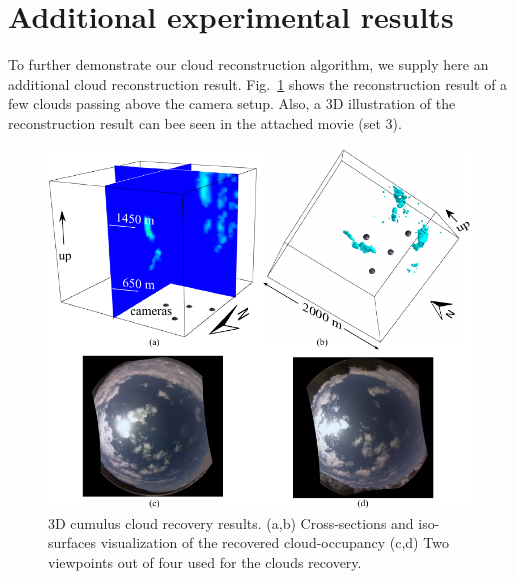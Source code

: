 \documentclass[runningheads]{llncs}
\begin{document}
\section{Additional experimental results}
\label{sec:addexp}

To further demonstrate our cloud reconstruction algorithm, we supply
here an additional cloud reconstruction result. Fig.~\ref{fig:scene}
shows the reconstruction result of a few clouds passing above the
camera setup.  Also, a 3D illustration of the reconstruction result
can bee seen in the attached movie (set 3).

\begin{figure}
  \begin{center}
    \includegraphics{figures/clouds_reconstructions_supp}
    \caption{3D cumulus cloud recovery results. (a,b) Cross-sections
      and iso-surfaces visualization of the recovered cloud-occupancy
      (c,d) Two viewpoints out of four used for the clouds recovery.}
    \label{fig:scene}
  \end{center}
\end{figure}
\newpage
 

\end{document}
